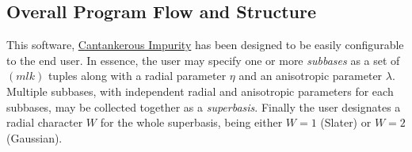 






\subsection{Overall Program Flow and Structure}
\label{subsection:program-flow}

This software, \href{https://gitlab.com/cantankerous-impurity/}{Cantankerous
Impurity} has been designed to be easily configurable to the end user. In
essence, the user may specify one or more \emph{subbases} as a set of
$\left(mlk\right)$ tuples along with a radial parameter $\eta$ and an
anisotropic parameter $\lambda$. Multiple subbases, with independent radial and
anisotropic parameters for each subbases, may be collected together as a
\emph{superbasis}. Finally the user designates a radial character $W$ for the
whole superbasis, being either $W = 1$ (Slater) or $W = 2$ (Gaussian).

